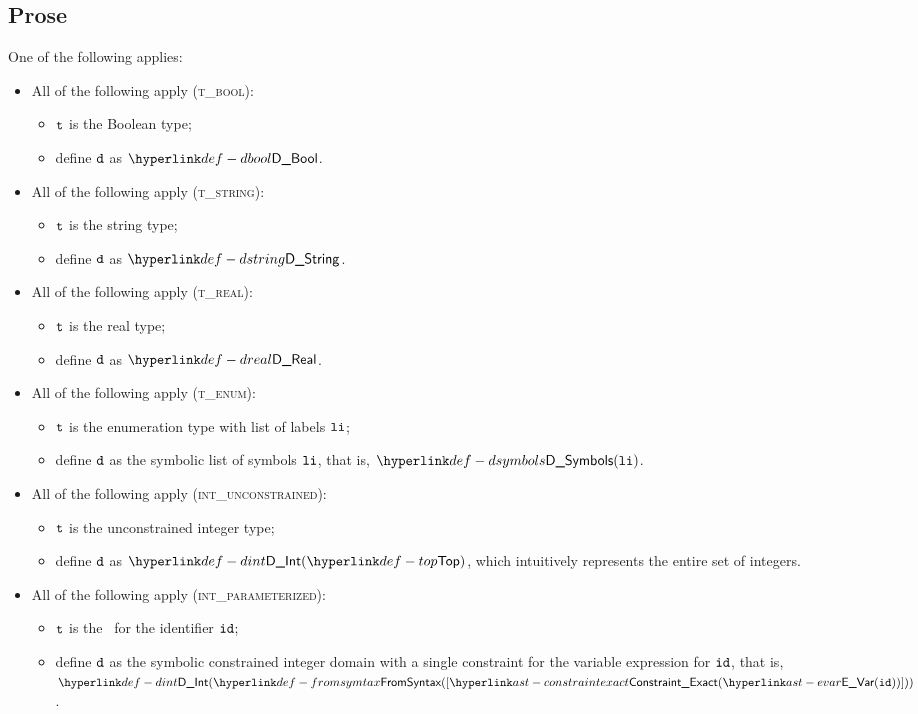 \subsection{Prose}
One of the following applies:
\begin{itemize}
  \item All of the following apply (\textsc{t\_bool}):
  \begin{itemize}
    \item $\texttt{t}$ is the Boolean type;
    \item define $\texttt{d}$ as $\DBool$.
  \end{itemize}

  \item All of the following apply (\textsc{t\_string}):
  \begin{itemize}
    \item $\texttt{t}$ is the string type;
    \item define $\texttt{d}$ as $\DString$.
  \end{itemize}

  \item All of the following apply (\textsc{t\_real}):
  \begin{itemize}
    \item $\texttt{t}$ is the real type;
    \item define $\texttt{d}$ as $\DReal$.
  \end{itemize}

  \item All of the following apply (\textsc{t\_enum}):
  \begin{itemize}
    \item $\texttt{t}$ is the enumeration type with list of labels $\texttt{li}$;
    \item define $\texttt{d}$ as the symbolic list of symbols $\texttt{li}$, that is, $\DSymbols(\vli)$.
  \end{itemize}

  \item All of the following apply (\textsc{int\_unconstrained}):
  \begin{itemize}
    \item $\texttt{t}$ is the unconstrained integer type;
    \item define $\texttt{d}$ as $\DInt(\Top)$, which intuitively represents the entire set of integers.
  \end{itemize}

  \item All of the following apply (\textsc{int\_parameterized}):
  \begin{itemize}
    \item $\texttt{t}$ is the \parameterizedintegertype\ for the identifier $\texttt{id}$;
    \item define $\texttt{d}$ as the symbolic constrained integer domain with a single constraint for the variable expression for $\texttt{id}$,
          that is, \\ $\DInt(\FromSyntax([\ConstraintExact(\EVar(\id))]))$.
  \end{itemize}


\end{itemize}
